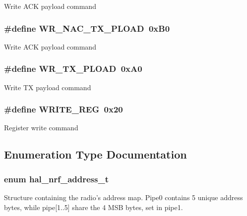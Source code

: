\label{group__nordic__hal__nrf__reg_ga07b82f8a30b55b02b77c87d6d4953f6d}
Write ACK payload command \hypertarget{group__nordic__hal__nrf__reg_ga475a03dfa6b8358e02ac25c1bc8a5de7}{
\subsubsection[{WR\_\-NAC\_\-TX\_\-PLOAD}]{\setlength{\rightskip}{0pt plus 5cm}\#define WR\_\-NAC\_\-TX\_\-PLOAD~0xB0}}
\label{group__nordic__hal__nrf__reg_ga475a03dfa6b8358e02ac25c1bc8a5de7}
Write ACK payload command \hypertarget{group__nordic__hal__nrf__reg_ga97a60093aef6135e38bd0bd91cd40428}{
\subsubsection[{WR\_\-TX\_\-PLOAD}]{\setlength{\rightskip}{0pt plus 5cm}\#define WR\_\-TX\_\-PLOAD~0xA0}}
\label{group__nordic__hal__nrf__reg_ga97a60093aef6135e38bd0bd91cd40428}
Write TX payload command \hypertarget{group__nordic__hal__nrf__reg_gab4589895853859c8ae1e26287efa3c1d}{
\subsubsection[{WRITE\_\-REG}]{\setlength{\rightskip}{0pt plus 5cm}\#define WRITE\_\-REG~0x20}}
\label{group__nordic__hal__nrf__reg_gab4589895853859c8ae1e26287efa3c1d}
Register write command 

\subsection{Enumeration Type Documentation}
\hypertarget{group__nordic__hal__nrf__reg_ga321d8cfbce9e410a49afac1f04cc2457}{
\subsubsection[{hal\_\-nrf\_\-address\_\-t}]{\setlength{\rightskip}{0pt plus 5cm}enum {\bf hal\_\-nrf\_\-address\_\-t}}}
\label{group__nordic__hal__nrf__reg_ga321d8cfbce9e410a49afac1f04cc2457}
Structure containing the radio's address map. Pipe0 contains 5 unique address bytes, while pipe\mbox{[}1..5\mbox{]} share the 4 MSB bytes, set in pipe1. 

